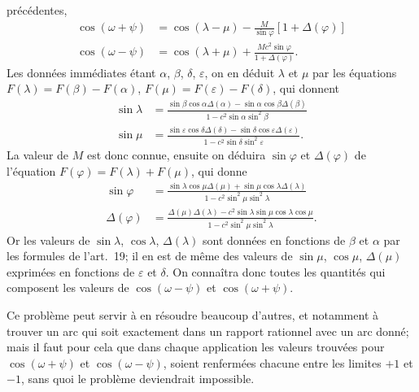 \documentclass{article}
\begin{document}
précédentes,
\[ \begin{aligned} \cos(\omega+\psi)&=\cos(\lambda-\mu)-\frac{M}{\sin\varphi}[1+\Delta(\varphi)]\\ \cos(\omega-\psi)&=\cos(\lambda+\mu)+\frac{Mc^{2}\sin\varphi}{1+\Delta(\varphi)}. \end{aligned} \]
Les données immédiates étant $\alpha$, $\beta$, $\delta$, $\varepsilon$, on en déduit $\lambda$ et $\mu$ par les équations $F(\lambda)=F(\beta)-F(\alpha)$, $F(\mu)=F(\varepsilon)-F(\delta)$, qui donnent
\[ \begin{aligned} \sin\lambda&=\frac{\sin\beta\cos\alpha\Delta(\alpha)-\sin\alpha\cos\beta\Delta(\beta)}{1-c^{2}\sin\alpha\sin^{2}\beta}\\ \sin\mu&=\frac{\sin\varepsilon\cos\delta\Delta(\delta)-\sin\delta\cos\varepsilon\Delta(\varepsilon)}{1-c^{2}\sin\delta\sin^{2}\varepsilon}. \end{aligned} \]
La valeur de $M$ est donc connue, ensuite on déduira $\sin\varphi$ et $\Delta(\varphi)$ de l'équation $F(\varphi)=F(\lambda)+F(\mu)$, qui donne
\[ \begin{aligned} \sin\varphi&=\frac{\sin\lambda\cos\mu\Delta(\mu)+\sin\mu\cos\lambda\Delta(\lambda)}{1-c^{2}\sin^{2}\mu\sin^{2}\lambda}\\ \Delta(\varphi)&=\frac{\Delta(\mu)\Delta(\lambda)-c^{2}\sin\lambda\sin\mu\cos\lambda\cos\mu}{1-c^{2}\sin^{2}\mu\sin^{2}\lambda}. \end{aligned} \]
Or les valeurs de $\sin\lambda$, $\cos\lambda$, $\Delta(\lambda)$ sont données en fonctions de $\beta$ et $\alpha$ par les formules de l'art.~19; il en est de même des valeurs de $\sin\mu$, $\cos\mu$, $\Delta(\mu)$ exprimées en fonctions de $\varepsilon$ et $\delta$. On connaîtra donc toutes les quantités qui composent les valeurs de $\cos(\omega-\psi)$ et $\cos(\omega+\psi)$.

Ce problème peut servir à en résoudre beaucoup d'autres, et notamment à trouver un arc qui soit exactement dans un rapport rationnel avec un arc donné; mais il faut pour cela que dans chaque application les valeurs trouvées pour $\cos(\omega+\psi)$ et $\cos(\omega-\psi)$, soient renfermées chacune entre les limites $+1$ et $-1$, sans quoi le problème deviendrait impossible.
\end{document}
